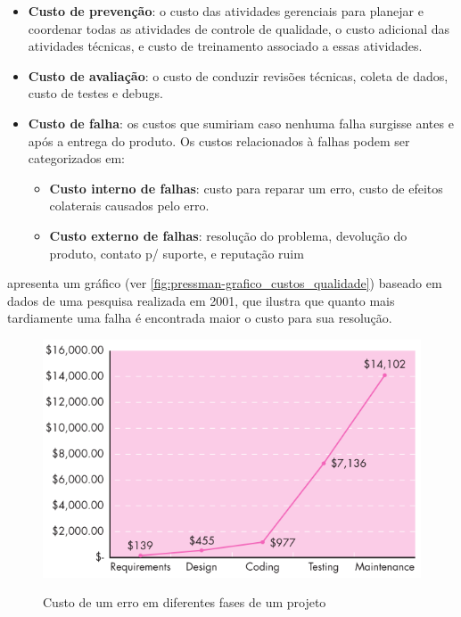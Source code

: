 \documentclass[
	12pt,				%
	openright,			%
	oneside,			%
	a4paper,			%
	english,			%
	brazil,				%
	]{abntex2}
\begin{document}
\begin{itemize}
    \item \textbf{Custo de prevenção}: o custo das atividades gerenciais para planejar e coordenar todas as atividades de controle de qualidade, o custo adicional das atividades técnicas, e custo de treinamento associado a essas atividades.
    \item \textbf{Custo de avaliação}: o custo de conduzir revisões técnicas, coleta de dados, custo de testes e debugs.
    \item \textbf{Custo de falha}: os custos que sumiriam caso nenhuma falha surgisse antes e após a entrega do produto. Os custos relacionados à falhas podem ser categorizados em:
    \begin{itemize}
        \item \textbf{Custo interno de falhas}: custo para reparar um erro, custo de efeitos colaterais causados pelo erro.
        \item \textbf{Custo externo de falhas}: resolução do problema, devolução do produto, contato p/ suporte, e reputação ruim
    \end{itemize}
\end{itemize}

 apresenta um gráfico (ver \autoref{fig:pressman-grafico_custos_qualidade}) baseado em dados de uma pesquisa realizada em 2001, que ilustra que quanto mais tardiamente uma falha é encontrada maior o custo para sua resolução.

\begin{figure}[h]
    \centering
    \caption{Custo de um erro em diferentes fases de um projeto}
    \graphicspath{ {./graphics/} }
    \includegraphics[scale=0.8]{pressman-grafico_custos_qualidade}
    \label{fig:pressman-grafico_custos_qualidade}
\end{figure}
\end{document}
